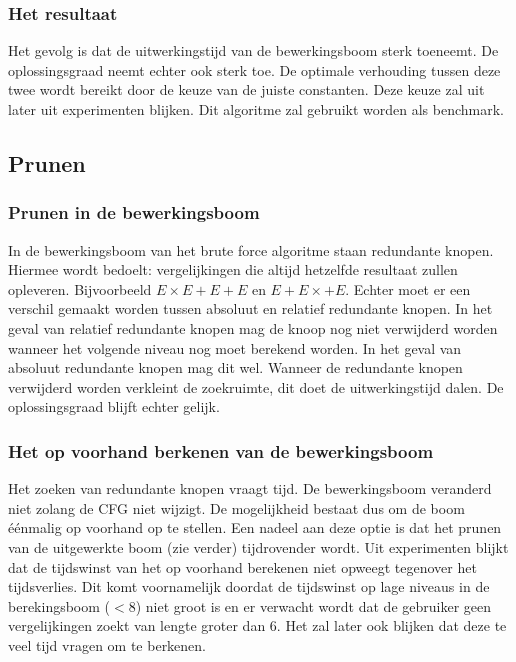 \documentclass[Main.tex]{subfiles}
\begin{document}
\subsubsection*{Het resultaat}
Het gevolg is dat de uitwerkingstijd van de bewerkingsboom sterk toeneemt. De oplossingsgraad %
neemt echter ook sterk toe. De optimale verhouding tussen deze twee wordt bereikt door de keuze van de juiste constanten. Deze keuze zal uit later uit experimenten blijken. Dit algoritme zal gebruikt worden als benchmark.
\subsection{Prunen}
\subsubsection*{Prunen in de bewerkingsboom}
In de bewerkingsboom van het brute force algoritme staan redundante knopen. Hiermee wordt bedoelt: vergelijkingen die altijd hetzelfde resultaat zullen opleveren. Bijvoorbeeld $E \times E+E+E$ en $E+E \times +E$. Echter moet er een verschil gemaakt worden tussen absoluut en relatief redundante knopen.%
In het geval van relatief redundante knopen mag de knoop nog niet verwijderd worden wanneer het volgende niveau nog moet berekend worden. In het geval van absoluut redundante knopen mag dit wel. Wanneer de redundante knopen verwijderd worden verkleint de zoekruimte, dit doet de uitwerkingstijd dalen. De oplossingsgraad blijft echter gelijk.
\subsubsection*{Het op voorhand berkenen van de bewerkingsboom}
Het zoeken van redundante knopen vraagt tijd. De bewerkingsboom veranderd niet zolang de CFG niet wijzigt. De mogelijkheid bestaat dus om de boom éénmalig op voorhand op te stellen. Een nadeel aan deze optie is dat het prunen van de uitgewerkte boom (zie verder) tijdrovender wordt. Uit experimenten blijkt dat de tijdswinst van het op voorhand berekenen niet opweegt tegenover het tijdsverlies. Dit komt voornamelijk doordat de tijdswinst op lage niveaus in de berekingsboom ($< 8$) niet groot is en er verwacht wordt dat de gebruiker geen vergelijkingen zoekt van lengte groter dan 6. Het zal later ook blijken dat deze te veel tijd vragen om te berkenen. 
\end{document}
